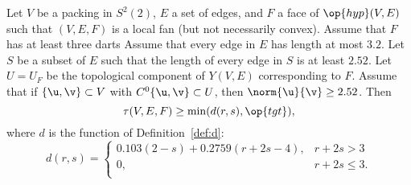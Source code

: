 \begin{theorem}\label{lemma:main-estimate-12}
  Let $V$ be a packing in $S^2(2)$, $E$ a set of edges, and $F$ a face
  of $\op{hyp}(V,E)$ such that $(V,E,F)$ is a local fan (but not necessarily convex).  
  Assume that $F$ has at least three
  darts Assume that every edge in $E$ has length at most $3.2$.  Let
  $S$ be a subset of $E$ such that the length of every edge in $S$ is
  at least $2.52$.  Let $U=U_F$ be the topological component of
  $Y(V,E)$ corresponding to $F$.  Assume that if $\{\u,\v\}\subset V$
  with $C^0\{\u,\v\}\subset U$, then %
  $\norm{\u}{\v}\ge 2.52$.
Then
\[\tau(V,E,F) \ge \min(d(r,s),\op{tgt}),\]
where $d$ is the function of Definition~\ref{def:d}:
\[ d(r,s) = \begin{cases}
0.103 (2-s) + 0.2759 (r+2s-4), & r + 2s > 3\\
0, & r + 2s \le 3.\\
\end{cases}\] 
\end{theorem}

